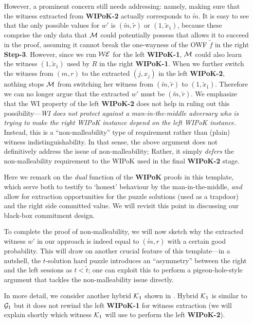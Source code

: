 However, a prominent concern still needs addressing: namely, making sure that the witness extracted from {\bf WIPoK-2} actually corresponds to $\tilde{m}$. It is easy to see that the only possible values for $w'$ is $(\tilde{m}, \tilde{r})$ or $(1, \tilde{x}_1)$, because these comprise the only data that $\mathcal{M}$ could potentially possess that allows it to succeed in the proof, assuming it cannot break the one-wayness of the OWF $\tilde{f}$ in the right {\bf Step-3}. However, since we run $\mathcal{WE}$ for the left {\bf WIPoK-1}, $\mathcal{M}$ could also learn the witness $(1, \tilde{x}_1)$ used by $R$ in the right {\bf WIPoK-1}. When we further switch the witness from $(m,r)$ to the extracted $(j, x_j)$ in the left {\bf WIPoK-2}, nothing stops $\mathcal{M}$ from switching her witness from $(\tilde{m}, \tilde{r})$ to $(1, \tilde{x}_1)$. Therefore we can no longer argue that the extracted $w'$ must be $(\tilde{m}, \tilde{r})$. We emphasize that the WI property of the left {\bf WIPoK-2} does not help in ruling out this possibility---{\em WI does not protect against a man-in-the-middle adversary who is trying to make the right WIPoK instance depend on the left WIPoK instance.} Instead, this is a ``non-malleability'' type of requirement rather than (plain) witness indistinguishability. In that sense, the above argument does not definitively address the issue of non-malleability; Rather, it simply {\em defers} the non-malleability requirement to the WIPoK used in the final {\bf WIPoK-2} stage.

Here we remark on the {\em dual} function of the {\bf WIPoK} proofs in this template, which serve both to testify to `honest' behaviour by the man-in-the-middle, {\em and} allow for extraction opportunities for the puzzle solutions (used as a trapdoor) and the right side committed value. We will revisit this point in discussing our black-box commitment design. 

 To complete the proof of non-malleability, we will now sketch why the extracted witness $w'$ in our approach is indeed equal to $(\tilde{m},r)$ with a certain good probability. This will draw on another crucial feature of this template---in a nutshell, the $t$-solution hard puzzle introduces an ``asymmetry'' between the right and the left sessions as $t<\tilde{t}$; one can exploit this to perform a pigeon-hole-style argument that tackles the non-malleability issue directly. 

In more detail, we consider another hybrid $\mathcal{K}_1$ shown in . Hybrid $\mathcal{K}_1$ is similar to $\mathcal{G}_{1}$ but it does not rewind the left {\bf WIPoK-1} for witness extraction (we will explain shortly which witness $\mathcal{K}_1$ will use to perform the left {\bf WIPoK-2}).

